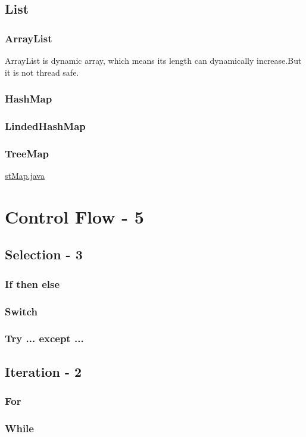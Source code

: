 \documentclass[12pt, a4pape]{article}
\begin{document}
		
		\subsection{List}
		\subsubsection{ArrayList}
		ArrayList is dynamic array, which means its length can dynamically increase.But it is not thread safe.
		\subsubsection{HashMap}
		\subsubsection{LindedHashMap}
		\subsubsection{TreeMap}
		
		\href{http://www.jobyme88.com}{stMap.java}


\section{Control Flow - 5}	
	\subsection{Selection - 3}
		\subsubsection{If then else}
		\subsubsection{Switch}
		\subsubsection{Try ... except ...}
	\subsection{Iteration - 2}
		\subsubsection{For}
		\subsubsection{While}
		
\end{document}
